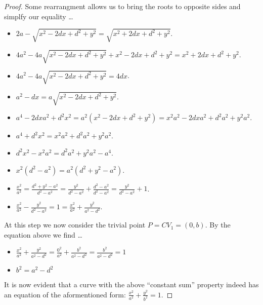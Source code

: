 \documentclass[12pt]{article}
\newcommand{\ds}{\displaystyle}
\theoremstyle{plain}
\begin{document}
\begin{proof}
  \newpage

  Some rearrangment allows us to bring the roots to opposite sides and simplfy our equality \dots

  \begin{itemize}
    \item $ \ds 2a - \sqrt{x^{2} - 2dx + d^{2} + y^{2}} = \sqrt{x^{2} + 2dx + d^{2} + y^{2}} $.
    \item $ \ds 4a^{2} - 4a\sqrt{x^{2} - 2dx + d^{2} + y^{2}} + x^{2} - 2dx + d^{2} + y^{2} = x^{2} + 2dx + d^{2} + y^{2} $.
    \item $ \ds 4a^{2} - 4a\sqrt{x^{2} - 2dx + d^{2} + y^{2}} = 4dx  $.
    \item $ \ds a^{2} - dx = a\sqrt{x^{2} - 2dx + d^{2} + y^{2}} $.
    \item $ \ds a^{4} - 2dxa^{2} + d^{2}x^{2} = a^{2}(x^{2} - 2dx + d^{2} + y^{2}) = x^{2}a^{2} - 2dxa^{2} + d^{2}a^{2} + y^{2}a^{2} $.
    \item $ \ds a^{4} + d^{2}x^{2} = x^{2}a^{2} + d^{2}a^{2} + y^{2}a^{2} $.
    \item $ \ds d^{2}x^{2} - x^{2}a^{2} = d^{2}a^{2} + y^{2}a^{2} - a^{4} $.
    \item $ \ds x^{2}(d^{2} - a^{2}) = a^{2}(d^{2} + y^{2} - a^{2}) $.
    \item $ \ds \frac{x^{2}}{a^{2}} = \frac{d^{2} + y^{2} - a^{2}}{d^{2} - a^{2}} = \frac{y^{2}}{d^{2} - a^{2}} + \frac{d^{2} - a^{2}}{d^{2} - a^{2}} = \frac{y^{2}}{d^{2} - a^{2}} + 1 $.
    \item $ \ds \frac{x^{2}}{a^{2}} - \frac{y^{2}}{d^{2} - a^{2}} = 1 = \frac{x^{2}}{a^{2}} + \frac{y^{2}}{a^{2} - d^{2}} $.
  \end{itemize}

  At this step we now consider the trivial point $ P = CV_{1} = (0,b) $. By the equation above we find \dots
  
  \begin{itemize}
    \item $ \ds \frac{x^{2}}{a^{2}} + \frac{y^{2}}{a^{2} - d^{2}} = \frac{0^{2}}{a^{2}} + \frac{b^{2}}{a^{2} - d^{2}} = \frac{b^{2}}{a^{2} - d^{2}} = 1 $
    \item $ \ds b^{2} = a^{2} - d^{2} $
  \end{itemize}

  It is now evident that a curve with the above ``constant sum'' property indeed has an equation of the aformentioned form: $ \ds \frac{x^2}{a^2} + \frac{y^2}{b^2} = 1 $.
\end{proof}
\end{document}
